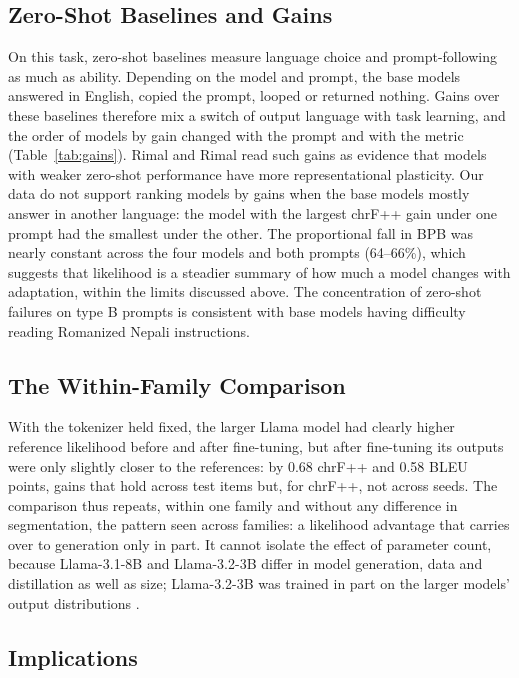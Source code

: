 \documentclass{article}
\begin{document}
\subsection{Zero-Shot Baselines and Gains}

On this task, zero-shot baselines measure language choice and prompt-following as much as ability. Depending on the model and prompt, the base models answered in English, copied the prompt, looped or returned nothing. Gains over these baselines therefore mix a switch of output language with task learning, and the order of models by gain changed with the prompt and with the metric (Table~\ref{tab:gains}). Rimal and Rimal \citep{rimal2026} read such gains as evidence that models with weaker zero-shot performance have more representational plasticity. Our data do not support ranking models by gains when the base models mostly answer in another language: the model with the largest chrF++ gain under one prompt had the smallest under the other. The proportional fall in BPB was nearly constant across the four models and both prompts (64–66\%), which suggests that likelihood is a steadier summary of how much a model changes with adaptation, within the limits discussed above. The concentration of zero-shot failures on type B prompts is consistent with base models having difficulty reading Romanized Nepali instructions.

\subsection{The Within-Family Comparison}

With the tokenizer held fixed, the larger Llama model had clearly higher reference likelihood before and after fine-tuning, but after fine-tuning its outputs were only slightly closer to the references: by 0.68 chrF++ and 0.58 BLEU points, gains that hold across test items but, for chrF++, not across seeds. The comparison thus repeats, within one family and without any difference in segmentation, the pattern seen across families: a likelihood advantage that carries over to generation only in part. It cannot isolate the effect of parameter count, because Llama-3.1-8B and Llama-3.2-3B differ in model generation, data and distillation as well as size; Llama-3.2-3B was trained in part on the larger models' output distributions \citep{meta2024b}.

\subsection{Implications}
\end{document}
